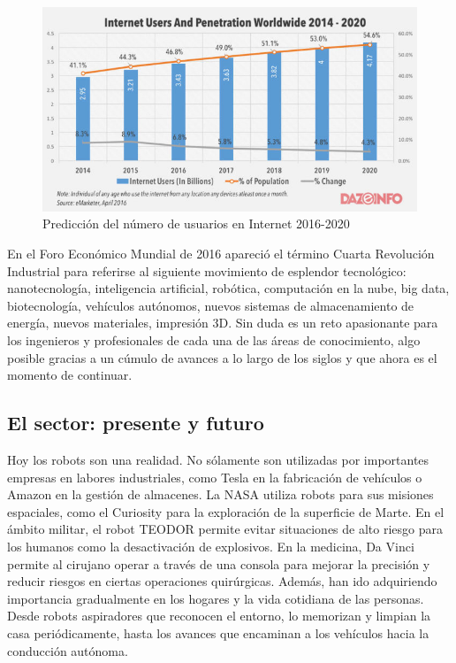 \documentclass[12pt,spanish,chapterprefix, numbers=noenddot]{book}
\numberwithin{equation}{section}
\numberwithin{figure}{section}
\begin{document}
\begin{figure}[hbt!]
\centering
\includegraphics[width=12cm]{Figs/internetWorldwide.jpg}
\par
\caption{\label{fig:internetWorldwide}Predicción del número de usuarios en Internet 2016-2020}
\end{figure}

En el Foro Económico Mundial de 2016 
\cite{forum_2016} apareció el término Cuarta Revolución Industrial para referirse al siguiente movimiento de esplendor tecnológico: nanotecnología, inteligencia artificial, robótica, computación en la nube, big data, biotecnología, vehículos autónomos, nuevos sistemas de almacenamiento de energía, nuevos materiales, impresión 3D. Sin duda es un reto apasionante para los ingenieros y profesionales de cada una de las áreas de conocimiento, algo posible gracias a un cúmulo de avances a lo largo de los siglos y que ahora es el momento de continuar. 


\subsection{El sector: presente y futuro}
Hoy los robots son una realidad. No sólamente son utilizadas por importantes empresas en labores industriales, como Tesla en la fabricación de vehículos o Amazon en la gestión de almacenes. La NASA utiliza robots para sus misiones espaciales, como el Curiosity para la exploración de la superficie de Marte.  En el ámbito militar, el robot TEODOR permite evitar situaciones de alto riesgo para los humanos como la desactivación de explosivos. En la medicina, Da Vinci permite al cirujano operar a través de una consola para mejorar la precisión y reducir riesgos en ciertas operaciones quirúrgicas. Además, han ido adquiriendo importancia gradualmente en los hogares y la vida cotidiana de las personas. Desde robots aspiradores que reconocen el entorno, lo memorizan y limpian la casa periódicamente, hasta los avances que encaminan a los vehículos hacia la conducción autónoma. 
\end{document}
